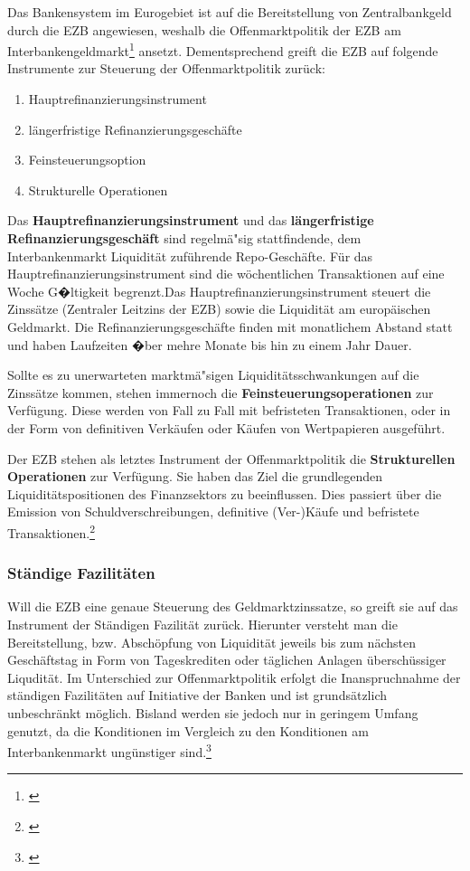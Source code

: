 \documentclass[
        onecolumn,
        a4paper,
        abstracton,
        parskip=half
        ,final
        ]{scrartcl}
\begin{document}
Das Bankensystem im Eurogebiet ist auf die Bereitstellung von Zentralbankgeld durch die EZB angewiesen, weshalb die Offenmarktpolitik der EZB am Interbankengeldmarkt\footnote[53]{\citep[vgl.][S.558f]{Basseler2010}} ansetzt. Dementsprechend greift die EZB auf folgende Instrumente zur Steuerung der Offenmarktpolitik zur{\"u}ck:
\begin{enumerate}
 \item{Hauptrefinanzierungsinstrument}
 \item{l{\"a}ngerfristige Refinanzierungsgesch{\"a}fte}
 \item{Feinsteuerungsoption}
 \item{Strukturelle Operationen}
 \end{enumerate}

Das \textbf{Hauptrefinanzierungsinstrument} und das \textbf{l{\"a}ngerfristige Refinanzierungsgesch{\"a}ft} sind regelm{\"a}{"s}ig stattfindende, dem Interbankenmarkt Liquidit{\"a}t zuf{\"u}hrende Repo-Gesch{\"a}fte.
F{\"u}r das Hauptrefinanzierungsinstrument sind die w{\"o}chentlichen Transaktionen auf eine Woche G�ltigkeit begrenzt.Das Hauptrefinanzierungsinstrument steuert die Zinss{\"a}tze (Zentraler Leitzins der EZB) sowie die Liquidit{\"a}t am europ{\"a}ischen Geldmarkt. Die Refinanzierungsgesch{\"a}fte finden mit monatlichem Abstand statt und haben  Laufzeiten �ber mehre Monate bis hin zu einem Jahr Dauer.


Sollte es zu unerwarteten marktm{\"a}{"s}igen Liquidit{\"a}tsschwankungen auf die Zinss{\"a}tze kommen, stehen immernoch die \textbf{Feinsteuerungsoperationen} zur Verf{\"u}gung. Diese werden von Fall zu Fall mit befristeten Transaktionen, oder in der Form von definitiven Verk{\"a}ufen oder K{\"a}ufen von Wertpapieren ausgef{\"u}hrt.

Der EZB stehen als letztes Instrument der Offenmarktpolitik die \textbf{Strukturellen Operationen} zur Verf{\"u}gung. Sie haben das Ziel die grundlegenden Liquidit{\"a}tspositionen des Finanzsektors zu beeinflussen. Dies passiert {\"u}ber die Emission von Schuldverschreibungen, definitive (Ver-)K{\"a}ufe und befristete Transaktionen.\footnote[58]{\citep[S.560]{Basseler2010}}

\subsubsection{St{\"a}ndige Fazilit{\"a}ten}  %

Will die EZB eine genaue Steuerung des Geldmarktzinssatze, so greift sie auf das Instrument der St{\"a}ndigen Fazilit{\"a}t zur{\"u}ck. Hierunter versteht man die Bereitstellung, bzw. Absch{\"o}pfung von Liquidit{\"a}t jeweils bis zum n{\"a}chsten Gesch{\"a}ftstag in Form von Tageskrediten oder t{\"a}glichen Anlagen {\"u}bersch{\"u}ssiger Liqudit{\"a}t. Im Unterschied zur Offenmarktpolitik erfolgt die Inanspruchnahme der st{\"a}ndigen Fazilit{\"a}ten auf Initiative der Banken und ist grunds{\"a}tzlich unbeschr{\"a}nkt m{\"o}glich. Bisland werden sie jedoch nur in geringem Umfang genutzt, da die Konditionen im Vergleich zu den Konditionen am Interbankenmarkt ung{\"u}nstiger sind.\footnote[59]{\citep[vgl.][S.560ff]{Basseler2010}}
\end{document}

